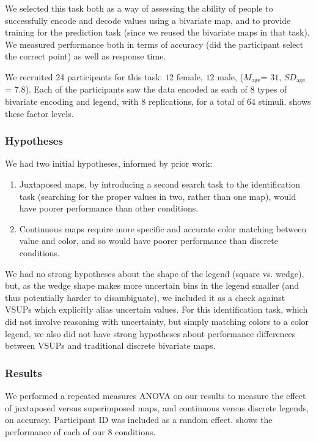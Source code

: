 We selected this task both as a way of assessing the ability of people to successfully encode and decode values using a bivariate map, and to provide training for the prediction task (since we reused the bivariate maps in that task). We measured performance both in terms of accuracy (did the participant select the correct point) as well as response time.

We recruited 24 participants for this task: $12$ female, $12$ male, ($M_{\text{age}}$= $31$, $SD_{\text{age}}$ = $7.8$). Each of the participants saw the data encoded as each of 8 types of bivariate encoding and legend, with 8 replications, for a total of 64 stimuli.  shows these factor levels.

\subsubsection{Hypotheses}

We had two initial hypotheses, informed by prior work:

\begin{enumerate}
	\item Juxtaposed maps, by introducing a second search task to the identification task (searching for the proper values in two, rather than one map), would have poorer performance than other conditions.
	\item Continuous maps require more specific and accurate color matching between value and color, and so would have poorer performance than discrete conditions.
\end{enumerate}

We had no strong hypotheses about the shape of the legend (square vs. wedge), but, as the wedge shape makes more uncertain bins in the legend smaller (and thus potentially harder to disambiguate), we included it as a check against VSUPs which explicitly alias uncertain values. For this identification task, which did not involve reasoning with uncertainty, but simply matching colors to a color legend, we also did not have strong hypotheses about performance differences between VSUPs and traditional discrete bivariate maps.

\subsubsection{Results}
\taskOneFig


We performed a repeated measures ANOVA on our results to measure the effect of juxtaposed versus superimposed maps, and continuous versus discrete legends, on accuracy. Participant ID was included as a random effect.  shows the performance of each of our 8 conditions.

